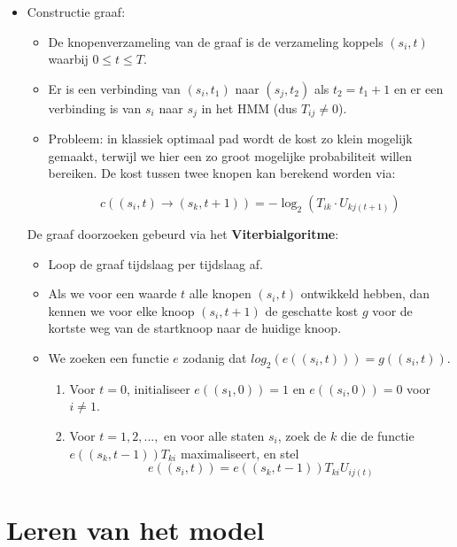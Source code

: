 \begin{itemize}
\begin{itemize}
	\end{itemize}
	\item Constructie graaf:
	\begin{itemize}
		\item De knopenverzameling van de graaf is de verzameling koppels $(s_i, t)$ waarbij $0 \leq t \leq T$.
		\item Er is een verbinding van $(s_i, t_1)$ naar $(s_j, t_2)$ als $t_2 = t_1 + 1$ en er een verbinding is van $s_i$ naar $s_j$ in het HMM (dus $T_{ij} \neq 0$).
		\item Probleem: in klassiek optimaal pad wordt de kost zo klein mogelijk gemaakt, terwijl we hier een zo groot mogelijke probabiliteit willen bereiken. De kost tussen twee knopen kan berekend worden via:

		$$c((s_i, t) \rightarrow (s_k, t + 1)) = - \log_2(T_{ik}\cdot U_{kj(t + 1)})$$
	\end{itemize}
	De graaf doorzoeken gebeurd via het \textbf{Viterbialgoritme}:
	\begin{itemize}
		\item Loop de graaf tijdslaag per tijdslaag af.
		\item Als we voor een waarde $t$ alle knopen $(s_i, t)$ ontwikkeld hebben, dan kennen we voor elke knoop $(s_i, t + 1)$ de geschatte kost $g$ voor de kortste weg van de startknoop naar de huidige knoop. 
		\item We zoeken een functie $e$ zodanig dat $log_2(e((s_i, t))) = g((s_i, t))$.
		\begin{enumerate}
			\item Voor $t = 0$, initialiseer $e((s_1, 0)) = 1$ en $e((s_i, 0)) = 0$ voor $i \neq 1$.
			\item Voor $t = 1, 2, ...,$ en voor alle staten $s_i$, zoek de $k$ die de functie $e((s_k, t - 1))T_{ki}$ maximaliseert, en stel 
			$$e((s_i, t)) = e((s_k, t - 1))T_{ki}U_{ij(t)}$$ 
		\end{enumerate}
	\end{itemize}
	

\end{itemize}

\section{Leren van het model}
